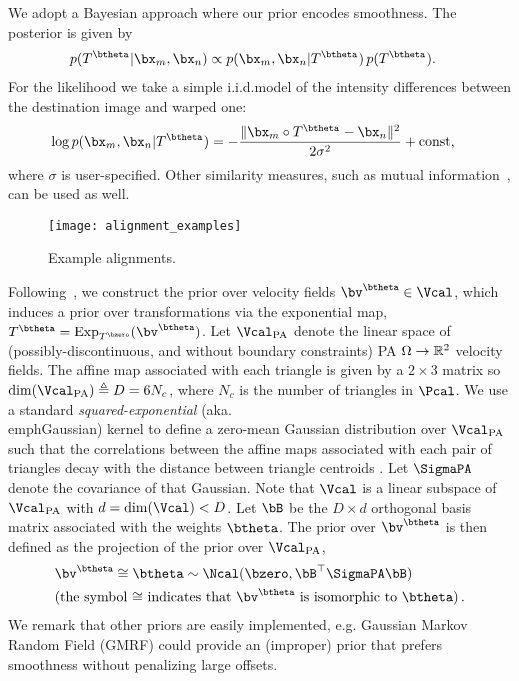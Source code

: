 \documentclass[twoside]{article}
\DeclareMathOperator{\Exp}{Exp}
\newcommand{\T}{^{\top}}
\begin{document}
        We adopt a Bayesian approach where our prior encodes
    smoothness. The posterior is given by  
    \begin{align}
      p(T^{\btheta_{}} | \bx_m, \bx_n)
        &\propto p( \bx_m, \bx_n | T^{\btheta_{}})\, p(T^{\btheta_{}}).
    \end{align}
    For the likelihood we take a simple i.i.d.\Gaussian model of the intensity
    differences between the destination image and warped one:
    \begin{align}
      \log p( \bx_m, \bx_n | T^{\btheta_{}})
       &= -\frac{\| \bx_m\circ T^{\btheta_{}} - \bx_n\|^2}{2\sigma^2} + \mathrm{const},
    \end{align}
    where $\sigma$ is user-specified. Other similarity measures,
    such as mutual information~\cite{viola1997alignment}, can be used as well.

\begin{figure*}
      \centering
      \texttt{[image: alignment\_examples]}
      \caption{Example alignments.}
      \label{fig:align_examples}
    \end{figure*}
  
    Following~\cite{freifeld2015transform}, we construct the prior over velocity fields $\bv^\btheta \in \Vcal$, which
    induces a prior over transformations via the exponential map,
    $T^\btheta = \Exp_{T^{\bzero}}(\bv^\btheta)$.
    Let $\Vpa$ denote the linear space of (possibly-discontinuous, and without
    boundary constraints) PA $\Omega \to \mathbb{R}^2$ velocity fields. 
    The affine map associated with each triangle is given by a $2 \times 3$ matrix
    so $\dim(\Vpa) \triangleq D = 6 N_c$, where $N_c$ is the number of
    triangles in $\Pcal$. We use a standard \emph{squared-exponential}
    (aka.\\emph{Gaussian}) kernel to define a zero-mean Gaussian distribution
    over $\Vpa$ such that the correlations between the affine maps associated
    with each pair of triangles decay with the distance between triangle centroids \cite{freifeld2015transform}.
    Let $\SigmaPA$ denote the covariance of that Gaussian. Note that $\Vcal$
    is a linear subspace of $\Vpa$ with $d = \dim(\Vcal) < D$.
    Let $\bB$ be the $D \times d$ orthogonal basis matrix associated with the weights
    $\btheta$. The prior over $\bv^\btheta$ is then defined as the projection of the
    prior over $\Vpa$,
    \begin{align}
      &\bv^\btheta \cong \btheta \sim \Ncal(\bzero, \bB\T \SigmaPA \bB)
      \\
       &\text{(the symbol $\cong$ indicates that $\bv^\btheta$ is isomorphic to $\btheta$)}\, . %
       \nonumber
    \end{align}
    We remark that other priors are easily implemented, e.g.\a%
    Gaussian Markov Random Field (GMRF) could provide an (improper) prior that
    prefers smoothness without penalizing large offsets.
\end{document}
